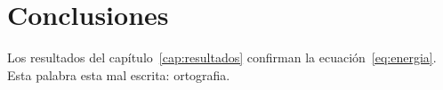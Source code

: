 \chapter{Conclusiones}
Los resultados del capítulo~\ref{cap:resultados} confirman la ecuación~\eqref{eq:energia}.
Esta palabra esta mal escrita: ortografia.
\lipsum[35-40]
